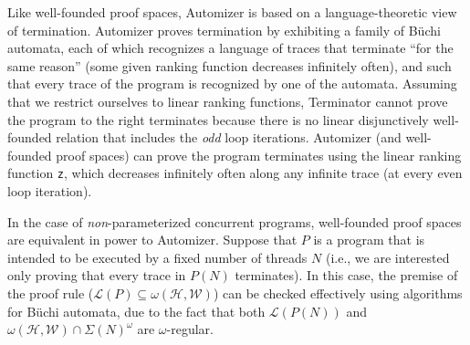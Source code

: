 \documentclass[9pt,nocopyrightspace]{sigplanconf}
\theoremstyle{definition}
\newcommand{\rankformulas}{\mathscr{W}}
\newcommand{\lang}{\mathcal{L}}
\newcommand{\iSigma}[1]{\Sigma(#1)}
\begin{document}
 Like well-founded proof spaces, Automizer is based on a language-theoretic
view of termination.  Automizer proves termination by exhibiting a family of
B\"{u}chi automata, each of which recognizes a language of traces that
terminate ``for the same reason'' (some given ranking function decreases
infinitely often), and such that every trace of the program is recognized by
one of the automata.  Assuming that we restrict ourselves to linear ranking
functions, Terminator cannot prove the program to the right terminates because
there is no linear disjunctively well-founded relation that includes the
\emph{odd} loop iterations.  Automizer (and well-founded proof spaces) can
prove the program terminates using the linear ranking function \texttt{z},
which decreases infinitely often along any infinite trace (at every even
loop iteration).

In the case of \emph{non}-parameterized concurrent programs, well-founded
proof spaces are equivalent in power to Automizer.  Suppose that $P$ is a
program that is intended to be executed by a fixed number of threads
$N$ (i.e., we are interested only proving that every trace in $P(N)$
terminates).  In this case, the premise of the proof rule ($\lang(P) \subseteq
\omega(\mathscr{H},\rankformulas)$) can be checked effectively using
algorithms for B\"{u}chi automata, due to the fact that both $\lang(P(N))$ and
$\omega(\mathscr{H},\rankformulas) \cap \iSigma{N}^\omega$ are
$\omega$-regular.
\end{document}
